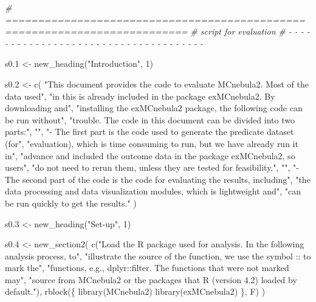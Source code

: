 \documentclass[
]{article}
\newenvironment{Shaded}{\begin{snugshade}}{\end{snugshade}}
\newcommand{\CommentTok}[1]{\textcolor[rgb]{0.56,0.35,0.01}{\textit{#1}}}
\newcommand{\DecValTok}[1]{\textcolor[rgb]{0.00,0.00,0.81}{#1}}
\newcommand{\FloatTok}[1]{\textcolor[rgb]{0.00,0.00,0.81}{#1}}
\newcommand{\FunctionTok}[1]{\textcolor[rgb]{0.00,0.00,0.00}{#1}}
\newcommand{\NormalTok}[1]{#1}
\newcommand{\OtherTok}[1]{\textcolor[rgb]{0.56,0.35,0.01}{#1}}
\newcommand{\StringTok}[1]{\textcolor[rgb]{0.31,0.60,0.02}{#1}}
\begin{document}
\begin{Shaded}
\begin{Highlighting}[]
\CommentTok{\# ==========================================================================}
\CommentTok{\# script for evaluation}
\CommentTok{\# {-} {-} {-} {-} {-} {-} {-} {-} {-} {-} {-} {-} {-} {-} {-} {-} {-} {-} {-} {-} {-} {-} {-} {-} {-} {-} {-} {-} {-} {-} {-} {-} {-} {-} {-} {-} {-}}

\NormalTok{s0}\FloatTok{.1} \OtherTok{\textless{}{-}} \FunctionTok{new\_heading}\NormalTok{(}\StringTok{"Introduction"}\NormalTok{, }\DecValTok{1}\NormalTok{)}

\NormalTok{s0}\FloatTok{.2} \OtherTok{\textless{}{-}} \FunctionTok{c}\NormalTok{(}
  \StringTok{"This document provides the code to evaluate MCnebula2. Most of the data used"}\NormalTok{,}
  \StringTok{"in this is already included in the package \textquotesingle{}exMCnebula2\textquotesingle{}. By downloading and"}\NormalTok{,}
  \StringTok{"installing the \textquotesingle{}exMCnebula2\textquotesingle{} package, the following code can be run without"}\NormalTok{,}
  \StringTok{"trouble. The code in this document can be divided into two parts:"}\NormalTok{,}
  \StringTok{""}\NormalTok{,}
  \StringTok{"{-} The first part is the code used to generate the predicate dataset (for"}\NormalTok{,}
  \StringTok{"evaluation), which is time consuming to run, but we have already run it in"}\NormalTok{,}
  \StringTok{"advance and included the outcome data in the package \textquotesingle{}exMCnebula2\textquotesingle{}, so users"}\NormalTok{,}
  \StringTok{"do not need to rerun them, unless they are tested for feasibility."}\NormalTok{,}
  \StringTok{""}\NormalTok{,}
  \StringTok{"{-} The second part of the code is the code for evaluating the results, including"}\NormalTok{,}
  \StringTok{"the data processing and data visualization modules, which is lightweight and"}\NormalTok{,}
  \StringTok{"can be run quickly to get the results."}
\NormalTok{)}

\NormalTok{s0}\FloatTok{.3} \OtherTok{\textless{}{-}} \FunctionTok{new\_heading}\NormalTok{(}\StringTok{"Set{-}up"}\NormalTok{, }\DecValTok{1}\NormalTok{)}

\NormalTok{s0}\FloatTok{.4} \OtherTok{\textless{}{-}} \FunctionTok{new\_section2}\NormalTok{(}
  \FunctionTok{c}\NormalTok{(}\StringTok{"Load the R package used for analysis.  In the following analysis process, to"}\NormalTok{,}
    \StringTok{"illustrate the source of the function, we use the symbol \textasciigrave{}::\textasciigrave{} to mark the"}\NormalTok{,}
    \StringTok{"functions, e.g., \textasciigrave{}dplyr::filter\textasciigrave{}.  The functions that were not marked may"}\NormalTok{,}
    \StringTok{"source from MCnebula2 or the packages that R (version 4.2) loaded by default."}\NormalTok{),}
  \FunctionTok{rblock}\NormalTok{(\{}
    \FunctionTok{library}\NormalTok{(MCnebula2)}
    \FunctionTok{library}\NormalTok{(exMCnebula2)}
\NormalTok{  \}, F)}
\NormalTok{)}


\end{Highlighting}
\end{Shaded}
\end{document}
